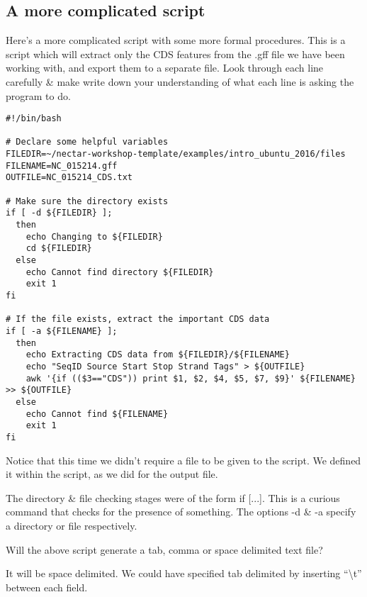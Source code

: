 \clearpage
\subsection*{A more complicated script}

Here's a more complicated script with some more formal procedures.
This is a script which will extract only the CDS features from the .gff file we have been working with, and export them to a separate file.
Look through each line carefully \& make write down your understanding of what each line is asking the program to do.

\begin{lstlisting}[style=command_syntax]
#!/bin/bash

# Declare some helpful variables
FILEDIR=~/nectar-workshop-template/examples/intro_ubuntu_2016/files
FILENAME=NC_015214.gff
OUTFILE=NC_015214_CDS.txt

# Make sure the directory exists
if [ -d ${FILEDIR} ];
  then
    echo Changing to ${FILEDIR}
    cd ${FILEDIR}
  else
    echo Cannot find directory ${FILEDIR}
    exit 1
fi

# If the file exists, extract the important CDS data
if [ -a ${FILENAME} ];
  then
    echo Extracting CDS data from ${FILEDIR}/${FILENAME}
    echo "SeqID Source Start Stop Strand Tags" > ${OUTFILE}
    awk '{if (($3=="CDS")) print $1, $2, $4, $5, $7, $9}' ${FILENAME} >> ${OUTFILE}
  else
    echo Cannot find ${FILENAME}
    exit 1
fi
\end{lstlisting}

Notice that this time we didn't require a file to be given to the script.
We defined it within the script, as we did for the output file.

\begin{information}
The directory \& file checking stages were of the form if [...].
This is a curious command that checks for the presence of something. 
The options -d \& -a specify a directory or file respectively.
\end{information}

\begin{questions}
Will the above script generate a tab, comma or space delimited text file? \\
\begin{answer}
It will be space delimited. 
We could have specified tab delimited by inserting ``\textbackslash t'' between each field.
\end{answer}
\end{questions}

